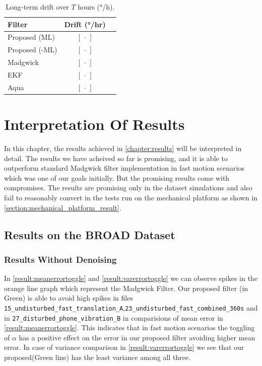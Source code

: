 \documentclass{iutbscthesis}
\begin{document}
\begin{table}[ht]
  \centering
  \caption{Long-term drift over \(T\) hours (°/h).}
  \label{tab:long_term_drift}
  \begin{tabular}{lcc}
    \toprule
    Filter & Drift (°/hr) \\
    \midrule
    Proposed (ML)     & \([\,\cdot\,]\) \\
    Proposed (-ML)    & \([\,\cdot\,]\) \\
    Madgwick           & \([\,\cdot\,]\) \\
    EKF                & \([\,\cdot\,]\) \\
    Aqua               & \([\,\cdot\,]\) \\
    \bottomrule
  \end{tabular}
\end{table}




\chapter{Interpretation Of Results} \label{chapter:discussion}

In this chapter, the results achieved in \autoref{chapter:results} will be interpreted in detail. The results we have acheived so far is promising, and it is able to outperform standard Madgwick filter implementation in fast motion scenarios which was one of our goals initially. But the promising results come with compromises. The results are promising only in the dataset simulations and also fail 
to reasonably convert in the tests run on the mechanical platform as shown in \autoref{section:mechanical_platform_result}. 

\section{Results on the BROAD Dataset}
\subsection{Results Without Denoising}
In \autoref{result:meanerrortoggle} and \autoref{result:varerrortoggle} we can observe spikes in the orange line graph
which represent the Madgwick Filter. Our proposed filter (in Green) is able to avoid high spikes in files \texttt{15\_undisturbed\_fast\_translation\_A},\texttt{23\_undisturbed\_fast\_combined\_360s} and in \texttt{27\_disturbed\_phone\_vibration\_B} 
in comparisions of mean error in \autoref{result:meanerrortoggle}. This indicates that in fast motion scenarios the toggling of $\alpha$ 
has a positive effect on the error in our proposed filter avoiding higher mean error. In case of variance comparison
in \autoref{result:varerrortoggle} we see that our proposed(Green line) has the least variance among all three.
\end{document}
